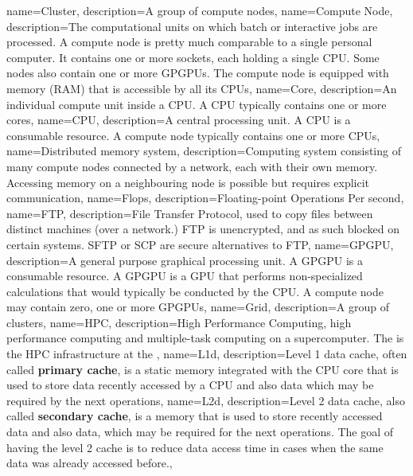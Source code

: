 {
  name={Cluster},
  description={A group of compute nodes},
}
{
  name={Compute Node},
  description={The computational units on which batch or interactive jobs are processed. A compute node is pretty much comparable to a single personal computer. It contains one or more sockets, each holding a single CPU. Some nodes also contain one or more GPGPUs. The compute node is equipped with memory (RAM) that is accessible by all its CPUs},
}
{
  name={Core},
  description={An individual compute unit inside a CPU. A CPU typically contains one or more cores},
}
{
  name={CPU},
  description={A central processing unit. A CPU is a consumable resource. A compute node typically contains one or more CPUs},
}
{
  name={Distributed memory system},
  description={Computing system consisting of many compute nodes connected by a network, each with their own memory. Accessing memory on a neighbouring node is possible but requires explicit communication},
}
{
  name={Flops},
  description={Floating-point Operations Per second},
}
{
  name={FTP},
  description={File Transfer Protocol, used to copy files between distinct machines (over a network.) FTP is unencrypted, and as such blocked on certain systems. SFTP or SCP are secure alternatives to FTP},
}
{
  name={GPGPU},
  description={A general purpose graphical processing unit. A GPGPU is a consumable resource. A GPGPU is a GPU that performs non-specialized calculations that would typically be conducted by the CPU. A compute node may contain zero, one or more GPGPUs},
}
{
  name={Grid},
  description={A group of clusters},
}
{
  name={HPC},
  description={High Performance Computing, high performance computing and multiple-task computing on a supercomputer. The \hpcInfra is the HPC infrastructure at the \university},
}
{
  name={L1d},
  description={Level 1 data cache, often called \textbf{primary cache}, is a static memory integrated with the CPU core that is used to store data recently accessed by a CPU and also data which may be required by the next operations},
}
{
  name={L2d},
  description={Level 2 data cache, also called \textbf{secondary cache}, is a memory that is used to store recently accessed data and also data, which may be required for the next operations. The goal of having the level 2 cache is to reduce data access time in cases when the same data was already accessed before.},
}
